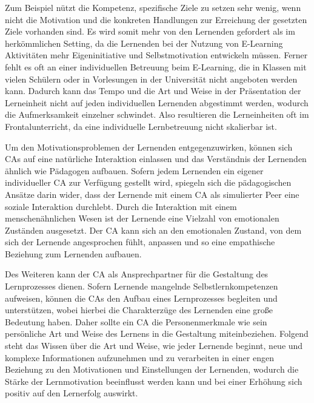 Zum Beispiel nützt die Kompetenz,
spezifische Ziele zu setzen sehr wenig, wenn nicht die Motivation und die konkreten Handlungen zur Erreichung der gesetzten Ziele vorhanden sind. \parencite[146 f.]{Nett.2019} 
Es wird somit mehr von den Lernenden gefordert als im herkömmlichen Setting, da die Lernenden bei der Nutzung von E-Learning Aktivitäten mehr 
Eigeninitiative und Selbstmotivation entwickeln müssen. \parencite[34]{marx.2006}
Ferner fehlt es oft an einer individuellen Betreuung beim E-Learning, die in Klassen mit vielen Schülern oder in Vorlesungen in der Universität nicht 
angeboten werden kann. 
Dadurch kann das Tempo und die Art und Weise in der Präsentation der Lerneinheit nicht auf jeden individuellen Lernenden abgestimmt werden,
wodurch die Aufmerksamkeit einzelner schwindet.
Also resultieren die Lerneinheiten oft im Frontalunterricht, da eine individuelle Lernbetreuung nicht skalierbar ist.
\parencite[1]{Oscar} \parencite[1]{Adel.2016}

Um den Motivationsproblemen der Lernenden entgegenzuwirken, können sich CAs auf eine natürliche Interaktion einlassen und das
Verständnis der Lernenden ähnlich wie Pädagogen aufbauen.\parencite[1]{winkler_hobert_salovaara_söllner_leimeister_2020}
Sofern jedem Lernenden ein eigener individueller CA zur Verfügung gestellt 
wird, spiegeln sich die pädagogischen Ansätze darin wider, dass der Lernende
mit einem CA als simulierter Peer eine soziale Interaktion durchlebt.
Durch die Interaktion mit einem menschenähnlichen Wesen ist der Lernende eine Vielzahl von
emotionalen Zuständen ausgesetzt. Der CA kann sich an den emotionalen Zustand, von dem sich der 
Lernende angesprochen fühlt, anpassen und so eine empathische Beziehung zum Lernenden aufbauen.\parencite[576 f.]{Kim.2006} 

Des Weiteren kann der CA als Ansprechpartner für die Gestaltung des Lernprozesses dienen.
Sofern Lernende mangelnde Selbstlernkompetenzen aufweisen, können die CAs den Aufbau eines Lernprozesses
begleiten und unterstützen, wobei hierbei die Charakterzüge des Lernenden eine große Bedeutung haben.
Daher sollte ein CA die Personenmerkmale wie sein persönliche Art und Weise des Lernens in die Gestaltung miteinbeziehen. \parencite[579]{Kim.2006} 
Folgend steht das Wissen über die Art und Weise, wie jeder Lernende beginnt, neue und komplexe Informationen aufzunehmen und zu verarbeiten 
in einer engen Beziehung zu den Motivationen und Einstellungen der Lernenden, wodurch die Stärke der 
Lernmotivation beeinflusst werden kann und bei einer Erhöhung sich positiv auf den Lernerfolg auswirkt.\parencite[30]{Schrader.2008} 

